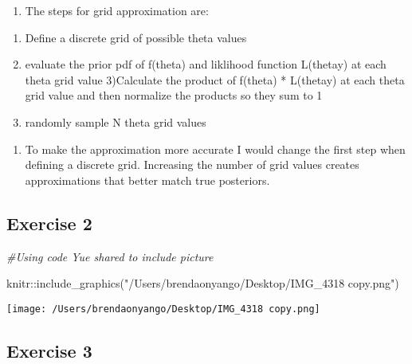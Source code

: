\documentclass[
]{article}
\newenvironment{Shaded}{\begin{snugshade}}{\end{snugshade}}
\newcommand{\CommentTok}[1]{\textcolor[rgb]{0.56,0.35,0.01}{\textit{#1}}}
\newcommand{\FunctionTok}[1]{\textcolor[rgb]{0.00,0.00,0.00}{#1}}
\newcommand{\NormalTok}[1]{#1}
\newcommand{\SpecialCharTok}[1]{\textcolor[rgb]{0.00,0.00,0.00}{#1}}
\newcommand{\StringTok}[1]{\textcolor[rgb]{0.31,0.60,0.02}{#1}}
\providecommand{\tightlist}{%
  \setlength{\itemsep}{0pt}\setlength{\parskip}{0pt}}
\begin{document}
\begin{enumerate}
\def\labelenumi{\alph{enumi})}
\tightlist
\item
  The steps for grid approximation are:
\end{enumerate}

\begin{enumerate}
\def\labelenumi{\arabic{enumi})}
\tightlist
\item
  Define a discrete grid of possible theta values
\item
  evaluate the prior pdf of f(theta) and liklihood function
  L(theta\textbar y) at each theta grid value 3)Calculate the product of
  f(theta) * L(theta\textbar y) at each theta grid value and then
  normalize the products so they sum to 1
\item
  randomly sample N theta grid values
\end{enumerate}

\begin{enumerate}
\def\labelenumi{\alph{enumi})}
\setcounter{enumi}{1}
\tightlist
\item
  To make the approximation more accurate I would change the first step
  when defining a discrete grid. Increasing the number of grid values
  creates approximations that better match true posteriors.
\end{enumerate}

\hypertarget{exercise-2}{%
\subsection{Exercise 2}\label{exercise-2}}

\begin{Shaded}
\begin{Highlighting}[]
\CommentTok{\#Using code Yue shared to include picture}

\NormalTok{knitr}\SpecialCharTok{::}\FunctionTok{include\_graphics}\NormalTok{(}\StringTok{"/Users/brendaonyango/Desktop/IMG\_4318 copy.png"}\NormalTok{)}
\end{Highlighting}
\end{Shaded}

\texttt{[image: /Users/brendaonyango/Desktop/IMG\_4318 copy.png]}

\hypertarget{exercise-3}{%
\subsection{Exercise 3}\label{exercise-3}}
\end{document}
